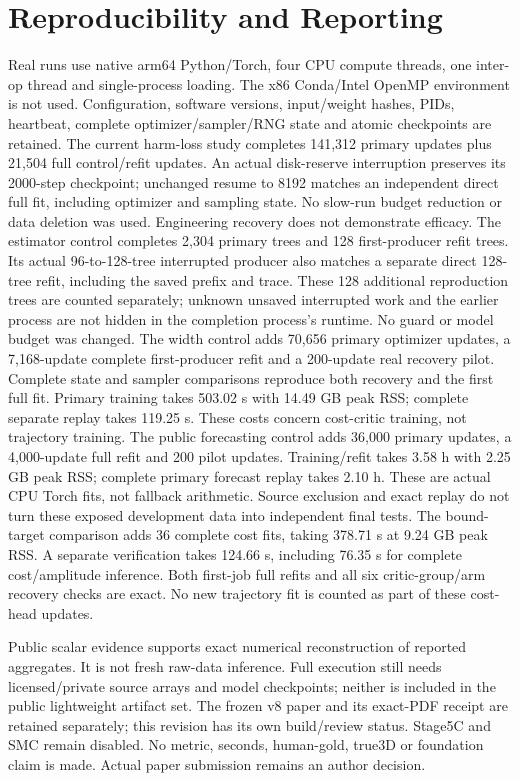 \documentclass[10pt,twocolumn,letterpaper]{article}
\begin{document}
\section{Reproducibility and Reporting}
Real runs use native arm64 Python/Torch, four CPU compute threads, one inter-op
thread and single-process loading. The x86 Conda/Intel OpenMP environment is not
used. Configuration, software versions, input/weight hashes, PIDs, heartbeat,
complete optimizer/sampler/RNG state and atomic checkpoints are retained.
The current harm-loss study completes 141,312 primary updates plus 21,504 full
control/refit updates. An actual disk-reserve interruption preserves its
2000-step checkpoint; unchanged resume to 8192 matches an independent direct
full fit, including optimizer and sampling state. No slow-run budget reduction
or data deletion was used. Engineering recovery does not demonstrate efficacy.
The estimator control completes 2,304 primary trees and 128 first-producer
refit trees. Its actual 96-to-128-tree interrupted producer also matches a
separate direct 128-tree refit, including the saved prefix and trace. These
128 additional reproduction trees are counted separately; unknown unsaved
interrupted work and the earlier process are not hidden in the completion
process's runtime. No guard or model budget was changed.
The width control adds 70,656 primary optimizer updates, a 7,168-update complete
first-producer refit and a 200-update real recovery pilot. Complete state and
sampler comparisons reproduce both recovery and the first full fit. Primary
training takes 503.02 s with 14.49 GB peak RSS; complete separate replay takes
119.25 s. These costs concern cost-critic training, not trajectory training.
The public forecasting control adds 36,000 primary updates, a 4,000-update full
refit and 200 pilot updates. Training/refit takes 3.58 h with 2.25 GB peak RSS;
complete primary forecast replay takes 2.10 h. These are actual CPU Torch fits,
not fallback arithmetic. Source exclusion and exact replay do not turn these
exposed development data into independent final tests.
The bound-target comparison adds 36 complete cost fits, taking 378.71 s at
9.24 GB peak RSS. A separate verification takes 124.66 s, including 76.35 s
for complete cost/amplitude inference. Both first-job full refits and all six
critic-group/arm recovery checks are exact. No new trajectory fit is counted
as part of these cost-head updates.

Public scalar evidence supports exact numerical reconstruction of reported
aggregates. It is not fresh raw-data inference. Full execution still needs
licensed/private source arrays and model checkpoints; neither is included in
the public lightweight artifact set. The frozen v8 paper and its exact-PDF
receipt are retained separately; this revision has its own build/review status.
Stage5C and SMC remain disabled. No metric, seconds, human-gold, true3D or
foundation claim is made. Actual paper submission remains an author decision.
\end{document}
